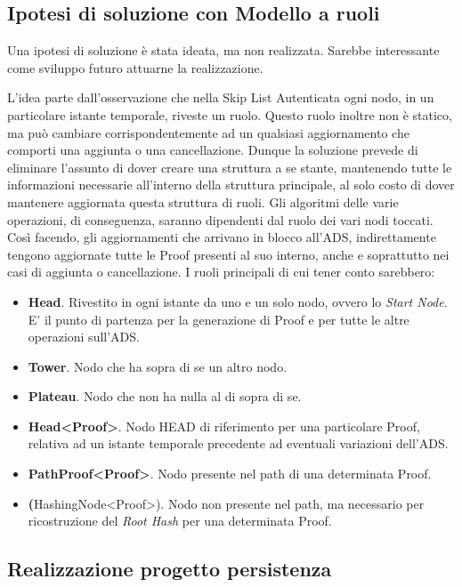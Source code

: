 	\subsection{Ipotesi di soluzione con Modello a ruoli}
	
	
		Una ipotesi di soluzione è stata ideata, ma non realizzata. Sarebbe interessante come sviluppo futuro attuarne la realizzazione.
		
		L'idea parte dall'osservazione che nella Skip List Autenticata ogni nodo, in un particolare istante temporale, riveste un ruolo. Questo ruolo inoltre non è statico, ma può cambiare corrispondentemente ad un qualsiasi aggiornamento che comporti una aggiunta o una cancellazione. Dunque la soluzione prevede di eliminare l'assunto di dover creare una struttura a se stante, mantenendo tutte le informazioni necessarie all'interno della struttura principale, al solo costo di dover mantenere aggiornata questa struttura di ruoli. Gli algoritmi delle varie operazioni, di conseguenza, saranno dipendenti dal ruolo dei vari nodi toccati. Così facendo, gli aggiornamenti che arrivano in blocco all'ADS, indirettamente tengono aggiornate tutte le Proof presenti al suo interno, anche e soprattutto nei casi di aggiunta o cancellazione.
		I ruoli principali di cui tener conto sarebbero:
		\begin{itemize}
			\item \textbf{Head}. Rivestito in ogni istante da uno e un solo nodo, ovvero lo \textit{Start Node}. E' il punto di partenza per la generazione di Proof e per tutte le altre operazioni sull'ADS.
			\item \textbf{Tower}. Nodo che ha sopra di se un altro nodo.
			\item \textbf{Plateau}. Nodo che non ha nulla al di sopra di se.
			\item \textbf{Head<Proof>}. Nodo HEAD di riferimento per una particolare Proof, relativa ad un istante temporale precedente ad eventuali variazioni dell'ADS.
			\item \textbf{PathProof<Proof>}. Nodo presente nel path di una determinata Proof.
			\item \textbf(HashingNode<Proof>). Nodo non presente nel path, ma necessario per ricostruzione del \textit{Root Hash} per una determinata Proof.
		\end{itemize}
		
	\subsection{Realizzazione progetto persistenza}
		
